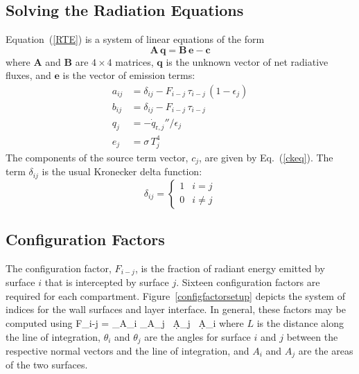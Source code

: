 \documentclass[12pt,twoside]{book}
\begin{document}

\subsection{Solving the Radiation Equations}

Equation~(\ref{RTE}) is a system of linear equations of the form
\begin{equation}
   \mathbf{A \, q} = \mathbf{B \, e - c}
\label{eq:linearsystem}
\end{equation}
where $\mathbf A$ and $\mathbf B$ are $4\times 4$ matrices, $\mathbf q$ is the unknown vector of net radiative fluxes, and $\mathbf e$ is the vector of emission terms:
\begin{align}
a_{ij}  &= \delta_{ij} - F_{i-j} \, \tau_{i-j} \, (1-\epsilon_j) \\
b_{ij}  &= \delta_{ij} - F_{i-j} \, \tau_{i-j} \\
q_j     &= -\dot{q}_{{\mathrm{r}},j}''/\epsilon_j \\
e_j     &= \sigma \, T_j^4
\end{align}
The components of the source term vector, $c_j$, are given by Eq.~(\ref{ckeq}).  The term $\delta_{ij}$ is the usual Kronecker delta function:
\begin{equation*}
\delta_{ij}=\left\{ \begin{array}{cc}
1&i=j\\
0&i\ne j
\end{array} \right.
\end{equation*}



\subsection{Configuration Factors}

The configuration factor, $F_{i-j}$, is the fraction of radiant energy emitted by surface $i$ that is intercepted by surface $j$.  Sixteen configuration factors are required for each compartment. Figure~\ref{configfactorsetup} depicts the system of indices for the wall surfaces and layer interface. In general, these factors may be computed using
\be
   F_{i-j} =  \int_{A_i} \int_{A_j}  \, \d A_j \, \d A_i \label{eq:config_factor}
\ee
where $L$ is the distance along the line of integration,  $\theta_i$ and $\theta_j$ are the angles for surface $i$ and $j$ between the respective normal vectors and the line of integration, and $A_i$ and $A_j$ are the areas of the two surfaces.
\end{document}
